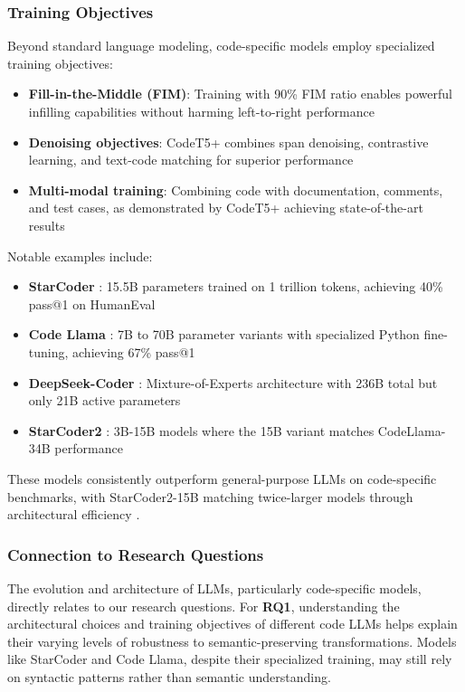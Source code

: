 \documentclass[%
thesis=student,%
coverpage=false,%
titlepage=false,%
headmarks=true, %
english,%
font=libertine, %
math=newpxtx, %
BCOR=5mm,%
coverBCOR=11mm%
]{tum-templates/book/tumbook}
\begin{document}
\subsubsection{Training Objectives}
Beyond standard language modeling, code-specific models employ specialized training objectives:
\begin{itemize}
    \item \textbf{Fill-in-the-Middle (FIM)}: Training with 90\% FIM ratio enables powerful infilling capabilities without harming left-to-right performance \cite{Bavarian2022}
    \item \textbf{Denoising objectives}: CodeT5+ combines span denoising, contrastive learning, and text-code matching for superior performance \cite{Wang2023}
    \item \textbf{Multi-modal training}: Combining code with documentation, comments, and test cases, as demonstrated by CodeT5+ achieving state-of-the-art results \cite{Wang2023}
\end{itemize}

Notable examples include:
\begin{itemize}
    \item \textbf{StarCoder} \cite{Li2023}: 15.5B parameters trained on 1 trillion tokens, achieving 40\% pass@1 on HumanEval
    \item \textbf{Code Llama} \cite{Roziere2023}: 7B to 70B parameter variants with specialized Python fine-tuning, achieving 67\% pass@1
    \item \textbf{DeepSeek-Coder} \cite{Guo2024, Zhu2024}: Mixture-of-Experts architecture with 236B total but only 21B active parameters
    \item \textbf{StarCoder2} \cite{Lozhkov2024}: 3B-15B models where the 15B variant matches CodeLlama-34B performance
\end{itemize}

These models consistently outperform general-purpose LLMs on code-specific benchmarks, with StarCoder2-15B matching twice-larger models through architectural efficiency \cite{Lozhkov2024}.

\subsubsection{Connection to Research Questions}

The evolution and architecture of LLMs, particularly code-specific models, directly relates to our research questions. 
For \textbf{RQ1}, understanding the architectural choices and training objectives of different code LLMs helps explain their varying levels of robustness to semantic-preserving transformations. Models like StarCoder and Code Llama, despite their specialized training, may still rely on syntactic patterns rather than semantic understanding.
\end{document}
